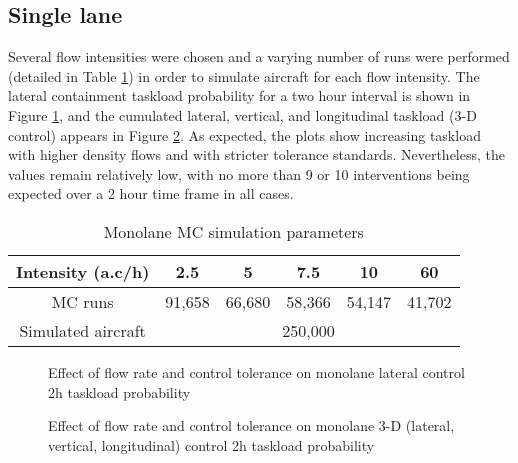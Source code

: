 \documentclass[conference]{IEEEtran}
\begin{document}
\subsection{Single lane}

Several flow intensities were chosen and a varying number of runs were performed (detailed in Table \ref{tab:1flow_MC}) in order to simulate  aircraft for each flow intensity. The lateral containment taskload probability for a two hour interval is shown in Figure \ref{fig:task_lat_1fl}, and the cumulated lateral, vertical, and longitudinal taskload (3-D control) appears in Figure \ref{fig:task_tot_1fl}. As expected, the plots show increasing taskload with higher density flows and with stricter tolerance standards. Nevertheless, the values remain relatively low, with no more than 9 or 10 interventions being expected over a 2 hour time frame in all cases. 

\begin{table}
\caption{Monolane MC simulation parameters}
\label{tab:1flow_MC}
\centering
\begin{tabular}{|c|c|c|c|c|c|}
\hline\hline 
Intensity  (a.c/h)&  2.5 & 5 & 7.5 & 10 & 60 \bigstrut\\ \hline
MC runs& 91,658 & 66,680 & 58,366 & 54,147 & 41,702 \bigstrut \\ \hline
Simulated aircraft & \multicolumn{5}{c|}{250,000} \bigstrut \\ \hline\hline
\end{tabular}
\end{table}


\begin{figure}[!h]
\centering
{}
\caption{Effect of flow rate and control tolerance on monolane lateral control 2h taskload probability}
\label{fig:task_lat_1fl}
\end{figure}


\begin{figure}[!h]
\centering
{}
\caption{Effect of flow rate and control tolerance on monolane 3-D (lateral, vertical, longitudinal) control 2h taskload probability}
\label{fig:task_tot_1fl}
\end{figure}
\end{document}
